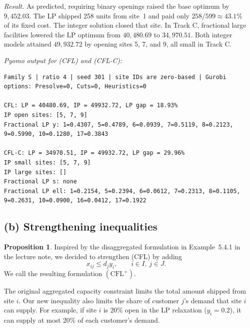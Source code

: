 \documentclass[11pt]{article}
\theoremstyle{definition}
\newtheorem{proposition}{Proposition}
\begin{document}
\emph{Result.}
As predicted, requiring binary openings raised the base optimum by
$9{,}452.03$. The LP shipped 258 units from site~1 and paid only
$258/599 \approx 43.1\%$ of its fixed cost. The integer solution closed
that site. In Track C, fractional large facilities lowered the LP
optimum from $40{,}480.69$ to $34{,}970.51$. Both integer models
attained $49{,}932.72$ by opening sites 5, 7, and 9, all small in
Track C.

\emph{Pyomo output for (CFL) and (CFL-C):}

\begin{proofbox}
\begin{Verbatim}[breaklines=true,fontsize=\fontsize{8}{7.2}\selectfont]
Family S | ratio 4 | seed 301 | site IDs are zero-based | Gurobi options: Presolve=0, Cuts=0, Heuristics=0

CFL: LP = 40480.69, IP = 49932.72, LP gap = 18.93%
IP open sites: [5, 7, 9]
Fractional LP y: 1=0.4307, 5=0.4789, 6=0.0939, 7=0.5119, 8=0.2123, 9=0.5990, 10=0.1280, 17=0.3843

CFL-C: LP = 34970.51, IP = 49932.72, LP gap = 29.96%
IP small sites: [5, 7, 9]
IP large sites: []
Fractional LP s: none
Fractional LP ell: 1=0.2154, 5=0.2394, 6=0.0612, 7=0.2313, 8=0.1105, 9=0.2631, 10=0.0900, 16=0.0412, 17=0.1922
\end{Verbatim}
\end{proofbox}

\subsection*{(b) Strengthening inequalities}
\begin{proposition}
Inspired by the disaggregated formulation in Example~5.4.1 in the
lecture note, we decided to strengthen (CFL) by adding
\[
    x_{ij} \le d_j y_i, \qquad i\in I,\ j\in J.
\]
We call the resulting formulation $(\mathrm{CFL}^+)$.
\end{proposition}
The original
aggregated capacity constraint limits the total amount shipped from site $i$. Our new inequality also limits the share of customer $j$'s demand
that site $i$ can supply. For example, if site $i$ is 20\% open
in the LP relaxation ($y_i=0.2$), it can supply at most 20\% of
each customer's demand.
\end{document}
